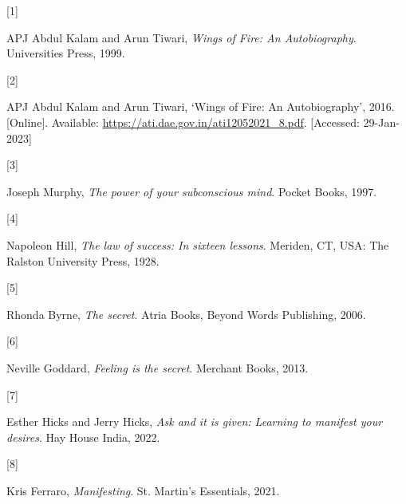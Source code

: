 \documentclass[
  a4paper,
]{article}
\newlength{\cslhangindent}
\newlength{\csllabelwidth}
\newlength{\cslentryspacingunit} %
\newenvironment{CSLReferences}[2] %
 {%
  \setlength{\parindent}{0pt}
  \ifodd #1
  \let\oldpar\par
  \def\par{\hangindent=\cslhangindent\oldpar}
  \fi
  \setlength{\parskip}{#2\cslentryspacingunit}
 }%
 {}
\newcommand{\CSLLeftMargin}[1]{\parbox[t]{\csllabelwidth}{#1}}
\newcommand{\CSLRightInline}[1]{\parbox[t]{\linewidth - \csllabelwidth}{#1}\break}
\begin{document}
\hypertarget{refs}{}
\begin{CSLReferences}{0}{0}
\leavevmode{}%
\CSLLeftMargin{{[}1{]} }%
\CSLRightInline{APJ Abdul Kalam and Arun Tiwari, \emph{{Wings of Fire:
An Autobiography}}. Universities Press, 1999. }

\leavevmode{}%
\CSLLeftMargin{{[}2{]} }%
\CSLRightInline{APJ Abdul Kalam and Arun Tiwari, {`{Wings of Fire: An
Autobiography}'}, 2016. {[}Online{]}. Available:
\url{https://ati.dae.gov.in/ati12052021_8.pdf}. {[}Accessed:
29-Jan-2023{]}}

\leavevmode{}%
\CSLLeftMargin{{[}3{]} }%
\CSLRightInline{Joseph Murphy, \emph{The power of your subconscious
mind}. Pocket Books, 1997. }

\leavevmode{}%
\CSLLeftMargin{{[}4{]} }%
\CSLRightInline{Napoleon Hill, \emph{The law of success: In sixteen
lessons}. Meriden, CT, USA: The Ralston University Press, 1928. }

\leavevmode{}%
\CSLLeftMargin{{[}5{]} }%
\CSLRightInline{Rhonda Byrne, \emph{The secret}. Atria Books, Beyond
Words Publishing, 2006. }

\leavevmode{}%
\CSLLeftMargin{{[}6{]} }%
\CSLRightInline{Neville Goddard, \emph{Feeling is the secret}. Merchant
Books, 2013. }

\leavevmode{}%
\CSLLeftMargin{{[}7{]} }%
\CSLRightInline{Esther Hicks and Jerry Hicks, \emph{Ask and it is given:
Learning to manifest your desires}. Hay House India, 2022. }

\leavevmode{}%
\CSLLeftMargin{{[}8{]} }%
\CSLRightInline{Kris Ferraro, \emph{Manifesting}. St. Martin's
Essentials, 2021. }

\end{CSLReferences}
\end{document}
